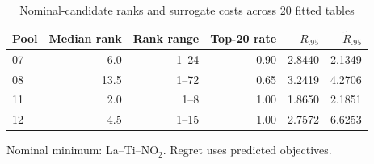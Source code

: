 \par
\begin{table}[H]
\centering
\begin{threeparttable}
\caption{Nominal-candidate ranks and surrogate costs across 20 fitted tables}\label{tab:nominal}
\begin{tabular}{@{}lrrrrr@{}}
\toprule
Pool & Median rank & Rank range & Top-20 rate & $R_{.95}$ & $\widetilde R_{.95}$\\
\midrule
07 & 6.0 & 1--24 & 0.90 & 2.8440 & 2.1349\\
08 & 13.5 & 1--72 & 0.65 & 3.2419 & 4.2706\\
11 & 2.0 & 1--8 & 1.00 & 1.8650 & 2.1851\\
12 & 4.5 & 1--15 & 1.00 & 2.7572 & 6.6253\\
\bottomrule
\end{tabular}
\begin{tablenotes}[flushleft]
\item[] Nominal minimum: La--Ti--$\mathrm{NO_2}$. Regret uses predicted objectives.
\end{tablenotes}
\end{threeparttable}
\end{table}
\par
